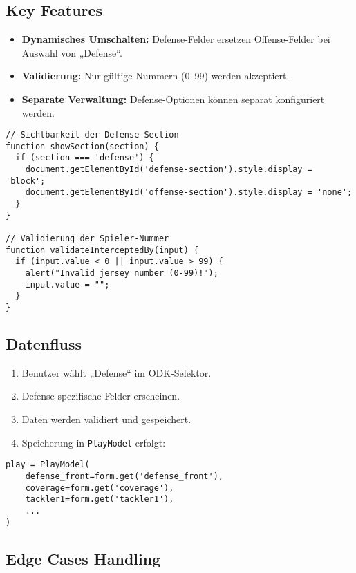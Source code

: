 \documentclass[12pt]{article}
\begin{document}
\subsection{Key Features}

\begin{itemize}
  \item \textbf{Dynamisches Umschalten:} Defense-Felder ersetzen Offense-Felder bei Auswahl von „Defense“.
  \item \textbf{Validierung:} Nur gültige Nummern (0–99) werden akzeptiert.
  \item \textbf{Separate Verwaltung:} Defense-Optionen können separat konfiguriert werden.
\end{itemize}

\begin{verbatim}
// Sichtbarkeit der Defense-Section
function showSection(section) {
  if (section === 'defense') {
    document.getElementById('defense-section').style.display = 'block';
    document.getElementById('offense-section').style.display = 'none';
  }
}

// Validierung der Spieler-Nummer
function validateInterceptedBy(input) {
  if (input.value < 0 || input.value > 99) {
    alert("Invalid jersey number (0-99)!");
    input.value = "";
  }
}
\end{verbatim}

\subsection{Datenfluss}

\begin{enumerate}
  \item Benutzer wählt „Defense“ im ODK-Selektor.
  \item Defense-spezifische Felder erscheinen.
  \item Daten werden validiert und gespeichert.
  \item Speicherung in \texttt{PlayModel} erfolgt:
\end{enumerate}

\begin{verbatim}
play = PlayModel(
    defense_front=form.get('defense_front'),
    coverage=form.get('coverage'),
    tackler1=form.get('tackler1'),
    ...
)
\end{verbatim}

\subsection{Edge Cases Handling}
\end{document}
